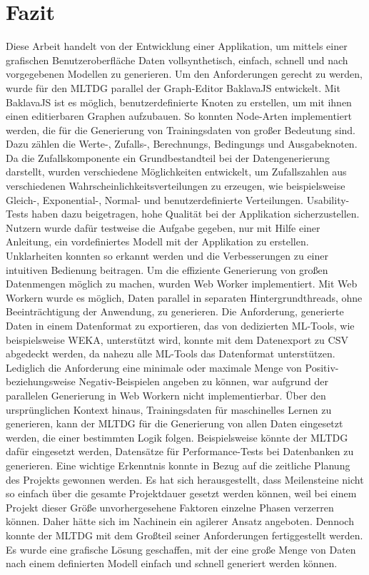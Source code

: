 
\chapter{Fazit}

Diese Arbeit handelt von der Entwicklung einer Applikation, um mittels einer grafischen Benutzeroberfläche Daten vollsynthetisch, einfach, schnell und nach vorgegebenen Modellen zu generieren. Um den Anforderungen gerecht zu werden, wurde für den \ac{MLTDG} parallel der Graph-Editor BaklavaJS entwickelt. Mit BaklavaJS ist es möglich, benutzerdefinierte Knoten zu erstellen, um mit ihnen einen editierbaren Graphen aufzubauen. So konnten Node-Arten implementiert werden, die für die Generierung von Trainingsdaten von großer Bedeutung sind. Dazu zählen die Werte-, Zufalls-, Berechnungs, Bedingungs und Ausgabeknoten. Da die Zufallskomponente ein Grundbestandteil bei der Datengenerierung darstellt, wurden verschiedene Möglichkeiten entwickelt, um Zufallszahlen aus verschiedenen Wahrscheinlichkeitsverteilungen zu erzeugen, wie beispielsweise Gleich-, Exponential-, Normal- und benutzerdefinierte Verteilungen. Usability-Tests haben dazu beigetragen, hohe Qualität bei der Applikation sicherzustellen. Nutzern wurde dafür testweise die Aufgabe gegeben, nur mit Hilfe einer Anleitung, ein vordefiniertes Modell mit der Applikation zu erstellen. Unklarheiten konnten so erkannt werden und die Verbesserungen zu einer intuitiven Bedienung beitragen. Um die effiziente Generierung von großen Datenmengen möglich zu machen, wurden Web Worker implementiert. Mit Web Workern wurde es möglich, Daten parallel in separaten Hintergrundthreads, ohne Beeinträchtigung der Anwendung, zu generieren. Die Anforderung, generierte Daten in einem Datenformat zu exportieren, das von dedizierten \ac{ML}-Tools, wie beispielsweise WEKA, unterstützt wird, konnte mit dem Datenexport zu \ac{CSV} abgedeckt werden, da nahezu alle \ac{ML}-Tools das Datenformat unterstützen. Lediglich die Anforderung eine minimale oder maximale Menge von Positiv- beziehungsweise Negativ-Beispielen angeben zu können, war aufgrund der parallelen Generierung in Web Workern nicht implementierbar. Über den ursprünglichen Kontext hinaus, Trainingsdaten für maschinelles Lernen zu generieren, kann der \ac{MLTDG} für die Generierung von allen Daten eingesetzt werden, die einer bestimmten Logik folgen. Beispielsweise könnte der \ac{MLTDG} dafür eingesetzt werden, Datensätze für Performance-Tests bei Datenbanken zu generieren. Eine wichtige Erkenntnis konnte in Bezug auf die zeitliche Planung des Projekts gewonnen werden. Es hat sich herausgestellt, dass Meilensteine nicht so einfach über die gesamte Projektdauer gesetzt werden können, weil bei einem Projekt dieser Größe unvorhergesehene Faktoren einzelne Phasen verzerren können. Daher hätte sich im Nachinein ein agilerer Ansatz angeboten. Dennoch konnte der \ac{MLTDG} mit dem Großteil seiner Anforderungen fertiggestellt werden. Es wurde eine grafische Lösung geschaffen, mit der eine große Menge von Daten nach einem definierten Modell einfach und schnell generiert werden können. 